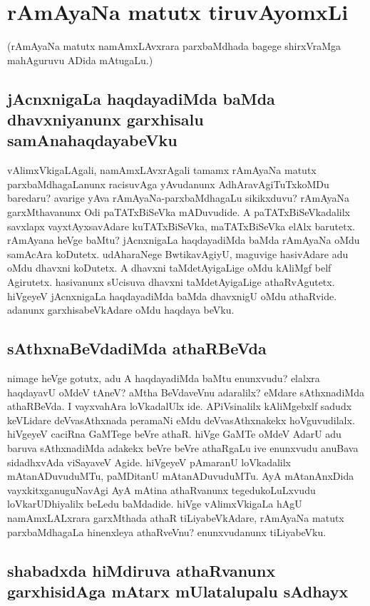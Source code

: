 \chapter{rAmAyaNa matutx tiruvAyomxLi}

(rAmAyaNa matutx namAmxLAvxrara parxbaMdhada bagege shirxVraMga mahAguruvu ADida mAtugaLu.)

\section*{jAcnxnigaLa haqdayadiMda baMda dhavxniyanunx garxhisalu samAnahaqdayabeVku}

vAlimxVkigaLAgali, namAmxLAvxrAgali tamamx rAmAyaNa matutx parxbaMdhagaLanunx racisuvAga yAvudanunx AdhAravAgiTuTxkoMDu baredaru? avarige yAva rAmAyaNa-parxbaMdhagaLu sikikxduvu? rAmAyaNa garxMthavanunx Odi paTATxBiSeVka mADuvudide. A paTATxBiSeVkadalilx savxlapx vayxtAyxsavAdare kuTATxBiSeVka, maTATxBiSeVka elAlx barutetx. rAmAyana heVge baMtu? jAcnxnigaLa haqdayadiMda baMda rAmAyaNa oMdu samAcAra koDutetx. udAharaNege BwtikavAgiyU, maguvige hasivAdare adu oMdu dhavxni koDutetx. A dhavxni taMdetAyigaLige oMdu kAliMgf belf Agirutetx. hasivanunx sUcisuva dhavxni taMdetAyigaLige athaRvAgutetx. hiVgeyeV jAcnxnigaLa haqdayadiMda baMda dhavxnigU oMdu athaRvide. adanunx garxhisabeVkAdare oMdu haqdaya beVku.

\section*{sAthxnaBeVdadiMda athaRBeVda}

nimage heVge gotutx, adu A haqdayadiMda baMtu enunxvudu? elalxra haqdayavU oMdeV tAneV? aMtha BeVdaveVnu adaralilx? eMdare sAthxnadiMda athaRBeVda. I vayxvahAra loVkadalUlx ide. APiVsinalilx kAliMgebxlf sadudx keVLidare deVvasAthxnada peramaNi eMdu deVvasAthxnakekx hoVguvudilalx. hiVgeyeV caciRna GaMTege beVre athaR. hiVge GaMTe oMdeV AdarU adu baruva sAthxnadiMda adakekx beVre beVre athaRgaLu ive enunxvudu anuBava sidadhxvAda viSayaveV Agide. hiVgeyeV pAmaranU loVkadalilx mAtanADuvuduMTu, paMDitanU mAtanADuvuduMTu. AyA‌ mAtanAnxDida vayxkitxganuguNavAgi AyA mAtina athaRvanunx tegedukoLuLxvudu loVkarUDhiyalilx beLedu baMdadide. hiVge vAlimxVkigaLa hAgU namAmxLALxrara garxMthada athaR tiLiyabeVkAdare, rAmAyaNa matutx parxbaMdhagaLa hinenxleya athaRveVnu? enunxvudanunx tiLiyabeVku. 


\section*{shabadxda hiMdiruva athaRvanunx garxhisidAga mAtarx mUlatalupalu sAdhayx}

